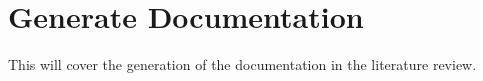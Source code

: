 \section{Generate Documentation}
\label{s:Generate-Documentation}
This will cover the generation of the documentation in the literature review.
